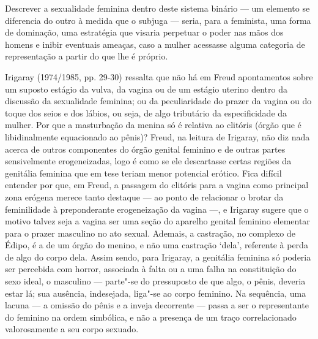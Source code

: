 Descrever a sexualidade feminina dentro deste sistema binário --- um
elemento se diferencia do outro à medida que o subjuga --- seria, para a
feminista, uma forma de dominação, uma estratégia que visaria perpetuar
o poder nas mãos dos homens e inibir eventuais ameaças, caso a mulher
acessasse alguma categoria de representação a partir do que lhe é
próprio.

Irigaray (1974/1985, pp. 29-30) ressalta que não há em Freud
apontamentos sobre um suposto estágio da vulva, da vagina ou de um
estágio uterino dentro da discussão da sexualidade feminina; ou da
peculiaridade do prazer da vagina ou do toque dos seios e dos lábios, ou
seja, de algo tributário da especificidade da mulher. Por que a
masturbação da menina só é relativa ao clitóris (órgão que é
libidinalmente equacionado ao pênis)? Freud, na leitura de Irigaray, não
diz nada acerca de outros componentes do órgão genital feminino e de
outras partes sensivelmente erogeneizadas, logo é como se ele
descartasse certas regiões da genitália feminina que em tese teriam
menor potencial erótico. Fica difícil entender por que, em Freud, a
passagem do clitóris para a vagina como principal zona erógena merece
tanto destaque --- ao ponto de relacionar o brotar da feminilidade à
preponderante erogeneização da vagina ---, e Irigaray sugere que o
motivo talvez seja a vagina ser uma seção do aparelho genital feminino
elementar para o prazer masculino no ato sexual. Ademais, a castração,
no complexo de Édipo, é a de um órgão do menino, e não uma castração
`dela', referente à perda de algo do corpo dela. Assim sendo, para
Irigaray, a genitália feminina só poderia ser percebida com horror,
associada à falta ou a uma falha na constituição do sexo ideal, o
masculino --- parte"-se do pressuposto de que algo, o pênis, deveria estar
lá; sua ausência, indesejada, liga"-se ao corpo feminino. Na sequência,
uma lacuna --- a omissão do pênis e a inveja decorrente --- passa a ser o
representante do feminino na ordem simbólica, e não a presença de um
traço correlacionado valorosamente a seu corpo sexuado.

